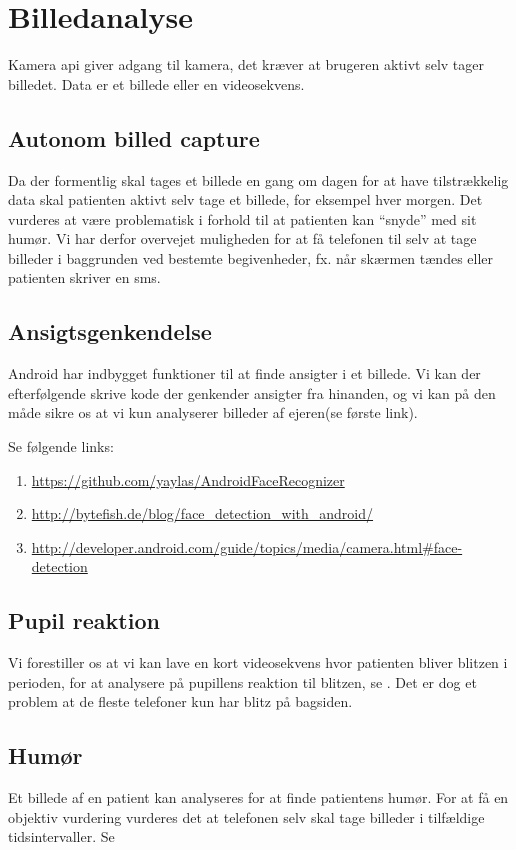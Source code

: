 \section{Billedanalyse}
Kamera api giver adgang til kamera, det kræver at brugeren aktivt selv tager billedet. Data er et billede eller en videosekvens.

\subsection{Autonom billed capture}
Da der formentlig skal tages et billede en gang om dagen for at have tilstrækkelig data skal patienten aktivt selv tage et billede, for eksempel hver morgen.
Det vurderes at være problematisk i forhold til at patienten kan ``snyde'' med sit humør.
Vi har derfor overvejet muligheden for at få telefonen til selv at tage billeder i baggrunden ved bestemte begivenheder, fx. når skærmen tændes eller patienten skriver en sms.

\subsection{Ansigtsgenkendelse}
Android har indbygget funktioner til at finde ansigter i et billede. 
Vi kan der efterfølgende skrive kode der genkender ansigter fra hinanden, og vi kan på den måde sikre os at vi kun analyserer billeder af ejeren(se første link).

Se følgende links:
\begin{enumerate}
\item \url{https://github.com/yaylas/AndroidFaceRecognizer}

\item \url{http://bytefish.de/blog/face\_detection\_with\_android/}

\item \url{http://developer.android.com/guide/topics/media/camera.html#face-detection}
	
\end{enumerate}

\subsection{Pupil reaktion}
Vi forestiller os at vi kan lave en kort videosekvens hvor patienten bliver blitzen i perioden, for at analysere på pupillens reaktion til blitzen, se \cite{hoeks1993pupillary}.
Det er dog et problem at de fleste telefoner kun har blitz på bagsiden.

\subsection{Humør}

Et billede af en patient kan analyseres for at finde patientens humør. 
For at få en objektiv vurdering vurderes det at telefonen selv skal tage billeder i tilfældige tidsintervaller. 
Se \cite{kulkarni2009facial}